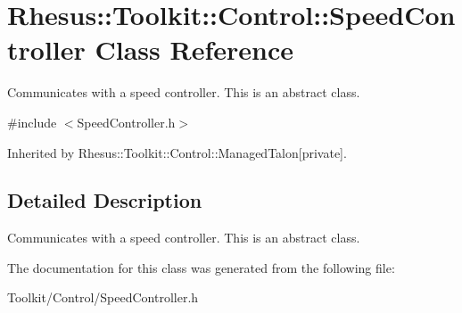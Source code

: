 \hypertarget{class_rhesus_1_1_toolkit_1_1_control_1_1_speed_controller}{\section{Rhesus\-:\-:Toolkit\-:\-:Control\-:\-:Speed\-Controller Class Reference}
\label{class_rhesus_1_1_toolkit_1_1_control_1_1_speed_controller}
}


Communicates with a speed controller. This is an abstract class.  




{\ttfamily \#include $<$Speed\-Controller.\-h$>$}



Inherited by Rhesus\-::\-Toolkit\-::\-Control\-::\-Managed\-Talon{\ttfamily  \mbox{[}private\mbox{]}}.



\subsection{Detailed Description}
Communicates with a speed controller. This is an abstract class. 

The documentation for this class was generated from the following file\-:\begin{DoxyCompactItemize}
\item 
Toolkit/\-Control/Speed\-Controller.\-h\end{DoxyCompactItemize}
